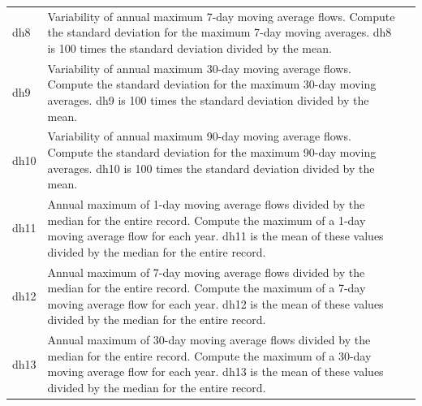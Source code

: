 \documentclass[a4paper,11pt]{article}\usepackage[]{graphicx}\usepackage[]{color}
\begin{document}
\begin{table}[ht]
\begin{threeparttable}[b]
\begin{tabularx}{\textwidth}{lXl}
  dh8 & Variability of annual maximum 7-day moving average flows. Compute the standard deviation for the maximum 7-day moving averages. dh8 is 100 times the standard deviation divided by the mean. \\
  dh9 & Variability of annual maximum 30-day moving average flows. Compute the standard deviation for the maximum 30-day moving averages. dh9 is 100 times the standard deviation divided by the mean. \\
  dh10 & Variability of annual maximum 90-day moving average flows. Compute the standard deviation for the maximum 90-day moving averages. dh10 is 100 times the standard deviation divided by the mean. \\
  dh11 & Annual maximum of 1-day moving average flows divided by the median for the entire record. Compute the maximum of a 1-day moving average flow for each year. dh11 is the mean of these values divided by the median for the entire record. \\
  dh12 & Annual maximum of 7-day moving average flows divided by the median for the entire record. Compute the maximum of a 7-day moving average flow for each year. dh12 is the mean of these values divided by the median for the entire record. \\
  dh13 & Annual maximum of 30-day moving average flows divided by the median for the entire record. Compute the maximum of a 30-day moving average flow for each year. dh13 is the mean of these values divided by the median for the entire record. \\
      \hline
  \end{tabularx}
  \end{threeparttable}
\end{table}
\end{document}
